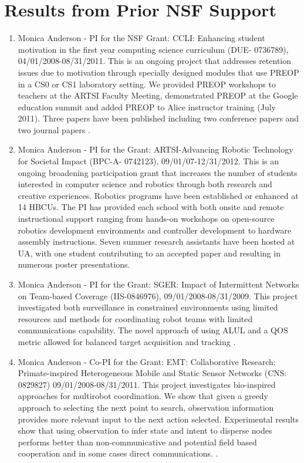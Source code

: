
\section{Results from Prior NSF Support}\label{sec:prior-nsf}
\begin{enumerate}
\item Monica Anderson - PI for the NSF Grant: CCLI: Enhancing student motivation in the first year computing science curriculum (DUE- 0736789), 04/01/2008-08/31/2011.  This is an ongoing project that addresses retention issues due to motivation through specially designed modules that use PREOP in a CS0 or CS1 laboratory setting.  We provided PREOP workshops to teachers at the ARTSI Faculty Meeting, demonstrated PREOP at the Google education summit and added PREOP to Alice instructor training (July 2011). Three papers have been published including two conference papers and two journal papers \cite{Davis2009,wellman2009alice,Wellman2009b,Anderson}.  

\item Monica Anderson - PI for the Grant: ARTSI-Advancing Robotic Technology for Societal Impact (BPC-A- 0742123), 09/01/07-12/31/2012. This is an ongoing broadening participation grant that increases the number of students interested in computer science and robotics through both research and creative experiences. Robotics programs have been established or enhanced at 14 HBCUs. The PI has provided each school with both onsite and remote instructional support ranging from hands-on workshops on open-source robotics development environments and controller development to hardware assembly instructions. Seven summer research assistants have been hosted at UA, with one student contributing to an accepted paper \cite{Wellman2009} and resulting in numerous poster presentations.  
\item Monica Anderson - PI for the Grant: SGER: Impact of Intermittent Networks on Team-based Coverage (IIS-0846976), 09/01/2008-08/31/2009. This project investigated both surveillance in constrained environments using limited resources and methods for coordinating robot teams with limited communications capability. The novel approach of using ALUL and a QOS metric allowed for balanced target acquisition and tracking \cite{Veluchamy2010,Alexander2009,Mckenzie2010,McKenzie2009}.  

\item Monica Anderson - Co-PI for the Grant: EMT: Collaborative Research: Primate-inspired Heterogeneous Mobile and Static Sensor Networks (CNS: 0829827) 09/01/2008-08/31/2011. This project investigates bio-inspired approaches for multirobot coordination. We show that given a greedy approach to selecting the next point to search, observation information provides more relevant input to the next action selected. Experimental results show that using observation to infer state and intent to disperse nodes performs better than non-communicative and potential field based cooperation and in some cases direct communications. \cite{Wellman2009d,Dawson2011,Dawson2010,Dawson2011b,Wellman2009c}.  


\end{enumerate}
